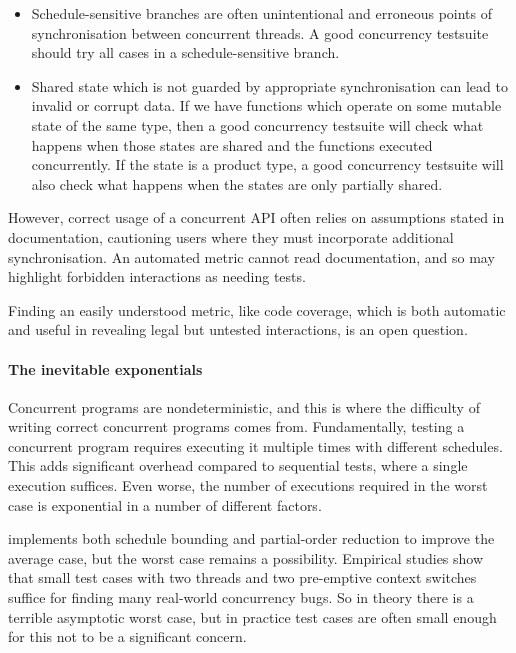 \begin{itemize}
\item Schedule-sensitive branches are often unintentional and
  erroneous points of synchronisation between concurrent
  threads\cite{huang2015ssb}.  A good concurrency testsuite should try
  all cases in a schedule-sensitive branch.

\item Shared state which is not guarded by appropriate synchronisation
  can lead to invalid or corrupt data.  If we have functions which
  operate on some mutable state of the same type, then a good
  concurrency testsuite will check what happens when those states are
  shared and the functions executed concurrently.  If the state is a
  product type, a good concurrency testsuite will also check what
  happens when the states are only partially shared.
\end{itemize}

However, correct usage of a concurrent API often relies on assumptions
stated in documentation, cautioning users where they must incorporate
additional synchronisation.  An automated metric cannot read
documentation, and so may highlight forbidden interactions as needing
tests.

Finding an easily understood metric, like code coverage, which is both
automatic and useful in revealing legal but untested interactions, is
an open question.

\paragraph{The inevitable exponentials}
Concurrent programs are nondeterministic, and this is where the
difficulty of writing correct concurrent programs comes from.
Fundamentally, testing a concurrent program requires executing it
multiple times with different schedules.  This adds significant
overhead compared to sequential tests, where a single execution
suffices.  Even worse, the number of executions required in the worst
case is exponential in a number of different
factors\cite{musuvathi2007}.

\dejafu{} implements both schedule
bounding\cite{emmi2011,musuvathi2008,musuvathi2007} and partial-order
reduction\cite{flanagan2005,godefroid1996} to improve the average
case, but the worst case remains a possibility.  Empirical studies
show that small test cases with two threads and two pre-emptive
context switches suffice for finding many real-world concurrency
bugs\cite{thomson2014}.  So in theory there is a terrible asymptotic
worst case, but in practice test cases are often small enough for this
not to be a significant concern.

